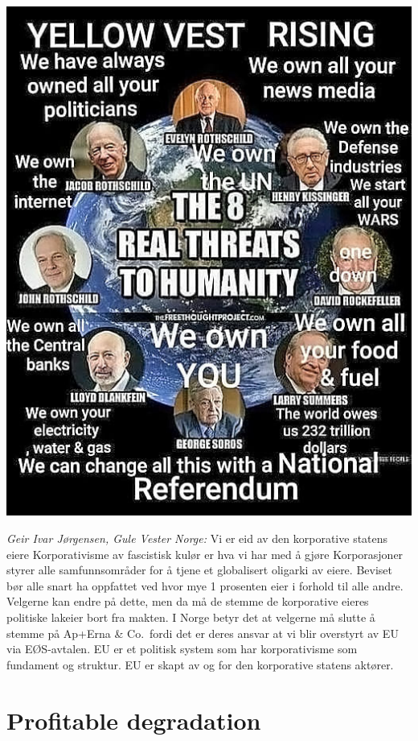 \documentclass[
]{book}
\begin{document}
\includegraphics{fig/Yellow_West_Rising.jpg}

\emph{Geir Ivar Jørgensen, Gule Vester Norge:}
Vi er eid av den korporative statens eiere
Korporativisme av fascistisk kulør er hva vi har med å gjøre
Korporasjoner styrer alle samfunnsområder for å tjene et globalisert oligarki av eiere.
Beviset bør alle snart ha oppfattet ved hvor mye 1 prosenten eier i forhold til alle andre.
Velgerne kan endre på dette, men da må de stemme de korporative eieres politiske lakeier bort fra makten.
I Norge betyr det at velgerne må slutte å stemme på Ap+Erna \& Co.~fordi det er deres ansvar at vi blir overstyrt av EU via EØS-avtalen. EU er et politisk system som har korporativisme som fundament og struktur. EU er skapt av og for den korporative statens aktører.

\hypertarget{profitable-degradation}{%
\section{Profitable degradation}\label{profitable-degradation}}
\end{document}
